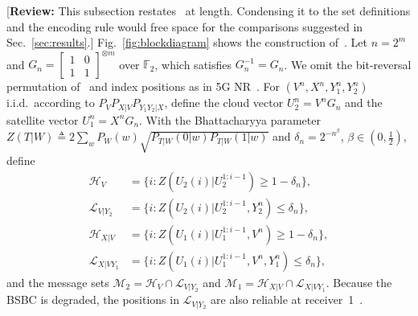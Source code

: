 \documentclass[conference]{IEEEtran}
\newcommand{\Hs}{\mathcal{H}}
\newcommand{\Ls}{\mathcal{L}}
\newcommand{\Ms}{\mathcal{M}}
\newcommand{\reviewnote}[1]{{\color{red}\footnotesize[\textbf{Review:} #1]}}
\begin{document}
\reviewnote{This subsection restates~\cite{6975233} at length. Condensing it to the set definitions and the encoding rule would free space for the comparisons suggested in Sec.~\ref{sec:results}.} Fig.~\ref{fig:blockdiagram} shows the construction of~\cite{6975233}. Let $n=2^m$ and $G_n=\left[\begin{smallmatrix}1&0\\1&1\end{smallmatrix}\right]^{\otimes m}$ over $\mathbb{F}_2$, which satisfies $G_n^{-1}=G_n$. We omit the bit-reversal permutation of~\cite{ArikanPolar} and index positions as in 5G NR~\cite{3gpp38212}. For $(V^n,X^n,Y_1^n,Y_2^n)$ i.i.d.\ according to $P_VP_{X|V}P_{Y_1Y_2|X}$, define the cloud vector $U_2^n=V^nG_n$ and the satellite vector $U_1^n=X^nG_n$. With the Bhattacharyya parameter $Z(T|W)\triangleq2\sum_wP_W(w)\sqrt{P_{T|W}(0|w)P_{T|W}(1|w)}$ and $\delta_n=2^{-n^\beta}$, $\beta\in(0,\frac12)$, define
\begin{align}
\Hs_{V}&=\{i:Z(U_2(i)|U_2^{1:i-1})\geq1-\delta_n\},\nonumber\\
\Ls_{V|Y_2}&=\{i:Z(U_2(i)|U_2^{1:i-1},Y_2^n)\leq\delta_n\},\nonumber\\
\Hs_{X|V}&=\{i:Z(U_1(i)|U_1^{1:i-1},V^n)\geq1-\delta_n\},\nonumber\\
\Ls_{X|VY_1}&=\{i:Z(U_1(i)|U_1^{1:i-1},V^n,Y_1^n)\leq\delta_n\},
\label{eq:sets}
\end{align}
and the message sets $\Ms_2=\Hs_V\cap\Ls_{V|Y_2}$ and $\Ms_1=\Hs_{X|V}\cap\Ls_{X|VY_1}$. Because the BSBC is degraded, the positions in $\Ls_{V|Y_2}$ are also reliable at receiver~1~\cite{6975233}.
\end{document}
